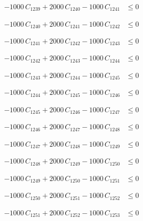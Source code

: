\documentclass[a4paper,11pt]{article}
\begin{document}
\begin{align}
-1000\,C_{1239} + 2000\,C_{1240} - 1000\,C_{1241} &\leq 0 \nonumber
\end{align}

\begin{align}
-1000\,C_{1240} + 2000\,C_{1241} - 1000\,C_{1242} &\leq 0 \nonumber
\end{align}

\begin{align}
-1000\,C_{1241} + 2000\,C_{1242} - 1000\,C_{1243} &\leq 0 \nonumber
\end{align}

\begin{align}
-1000\,C_{1242} + 2000\,C_{1243} - 1000\,C_{1244} &\leq 0 \nonumber
\end{align}

\begin{align}
-1000\,C_{1243} + 2000\,C_{1244} - 1000\,C_{1245} &\leq 0 \nonumber
\end{align}

\begin{align}
-1000\,C_{1244} + 2000\,C_{1245} - 1000\,C_{1246} &\leq 0 \nonumber
\end{align}

\begin{align}
-1000\,C_{1245} + 2000\,C_{1246} - 1000\,C_{1247} &\leq 0 \nonumber
\end{align}

\begin{align}
-1000\,C_{1246} + 2000\,C_{1247} - 1000\,C_{1248} &\leq 0 \nonumber
\end{align}

\begin{align}
-1000\,C_{1247} + 2000\,C_{1248} - 1000\,C_{1249} &\leq 0 \nonumber
\end{align}

\begin{align}
-1000\,C_{1248} + 2000\,C_{1249} - 1000\,C_{1250} &\leq 0 \nonumber
\end{align}

\begin{align}
-1000\,C_{1249} + 2000\,C_{1250} - 1000\,C_{1251} &\leq 0 \nonumber
\end{align}

\begin{align}
-1000\,C_{1250} + 2000\,C_{1251} - 1000\,C_{1252} &\leq 0 \nonumber
\end{align}

\begin{align}
-1000\,C_{1251} + 2000\,C_{1252} - 1000\,C_{1253} &\leq 0 \nonumber
\end{align}
\end{document}
